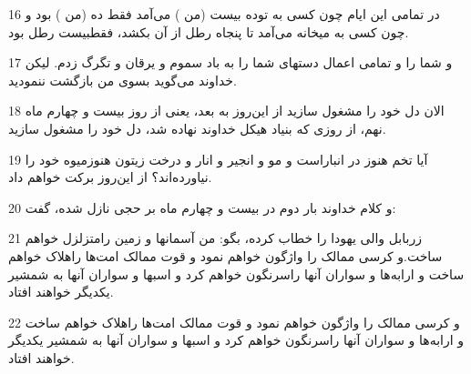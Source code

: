 \par 16 در تمامی این ایام چون کسی به توده بیست (من ) می‌آمد فقط ده (من ) بود و چون کسی به میخانه می‌آمد تا پنجاه رطل از آن بکشد، فقطبیست رطل بود.
\par 17 و شما را و تمامی اعمال دستهای شما را به باد سموم و یرقان و تگرگ زدم. لیکن خداوند می‌گوید بسوی من بازگشت ننمودید.
\par 18 الان دل خود را مشغول سازید از این‌روز به بعد، یعنی از روز بیست و چهارم ماه نهم، از روزی که بنیاد هیکل خداوند نهاده شد، دل خود را مشغول سازید.
\par 19 آیا تخم هنوز در انباراست و مو و انجیر و انار و درخت زیتون هنوزمیوه خود را نیاورده‌اند؟ از این‌روز برکت خواهم داد.
\par 20 و کلام خداوند بار دوم در بیست و چهارم ماه بر حجی نازل شده، گفت:
\par 21 زربابل والی یهودا را خطاب کرده، بگو: من آسمانها و زمین رامتزلزل خواهم ساخت.و کرسی ممالک را واژگون خواهم نمود و قوت ممالک امت‌ها راهلاک خواهم ساخت و ارابه‌ها و سواران آنها راسرنگون خواهم کرد و اسبها و سواران آنها به شمشیر یکدیگر خواهند افتاد.
\par 22 و کرسی ممالک را واژگون خواهم نمود و قوت ممالک امت‌ها راهلاک خواهم ساخت و ارابه‌ها و سواران آنها راسرنگون خواهم کرد و اسبها و سواران آنها به شمشیر یکدیگر خواهند افتاد.


